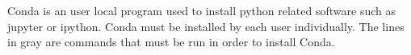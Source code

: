 \documentclass{../../../assets/LabArx-Dev} 	%
\begin{document}


\maketitle
\fancyfoot{}
Conda is an user local program used to install python related software such as jupyter or ipython. Conda must be installed by each user individually. The lines in gray are commands that must be run in order to install Conda.
\end{document}
